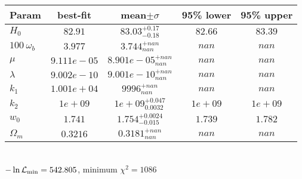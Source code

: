 \begin{tabular}{|l|c|c|c|c|} 
 \hline 
Param & best-fit & mean$\pm\sigma$ & 95\% lower & 95\% upper \\ \hline 
$H_{0 }$ &$82.91$ & $83.03_{-0.18}^{+0.17}$ & $82.66$ & $83.39$ \\ 
$100~\omega_{b }$ &$3.977$ & $3.744_{nan}^{+nan}$ & $nan$ & $nan$ \\ 
$\mu$ &$9.111e-05$ & $8.901e-05_{nan}^{+nan}$ & $nan$ & $nan$ \\ 
$\lambda$ &$9.002e-10$ & $9.001e-10_{nan}^{+nan}$ & $nan$ & $nan$ \\ 
$k_{1 }$ &$1.001e+04$ & $9996_{nan}^{+nan}$ & $nan$ & $nan$ \\ 
$k_{2 }$ &$1e+09$ & $1e+09_{0.0032}^{+0.047}$ & $1e+09$ & $1e+09$ \\ 
$w_{0 }$ &$1.741$ & $1.754_{-0.015}^{+0.0024}$ & $1.739$ & $1.782$ \\ 
$\Omega_{m }$ &$0.3216$ & $0.3181_{nan}^{+nan}$ & $nan$ & $nan$ \\ 
\hline 
 \end{tabular} \\ 
$-\ln{\cal L}_\mathrm{min} =542.805$, minimum $\chi^2=1086$ \\ 
